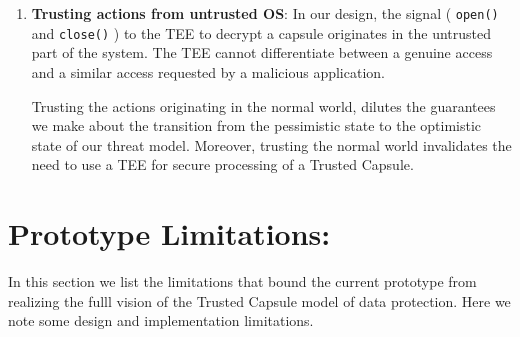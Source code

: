 \begin{enumerate}
    \item{\bf Trusting actions from untrusted OS}: In our design, the signal (
    {\tt open()} and {\tt close()} ) to the TEE to decrypt a capsule originates in
    the untrusted part of the system. The TEE cannot differentiate between a
    genuine access and a similar access requested by a malicious application.
    
    Trusting the actions originating in the normal world, dilutes the guarantees
    we make about the transition from the pessimistic state to the optimistic
    state of our threat model. Moreover, trusting the normal world invalidates
    the need to use a TEE for secure processing of a Trusted Capsule.
\end{enumerate}

\section{Prototype Limitations:}
In this section we list the limitations that bound the current prototype from
realizing the fulll vision of the Trusted Capsule model of data protection.
Here we note some design and implementation limitations.

